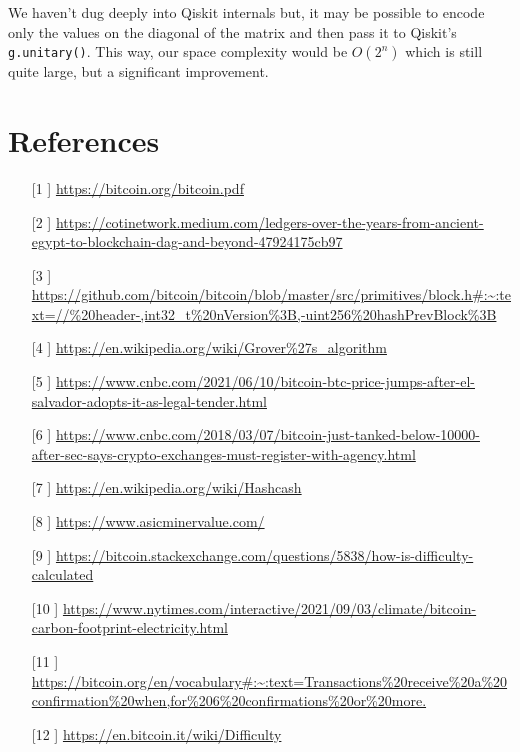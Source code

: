 \documentclass[11pt]{article} %
\begin{document}
\noindent We haven't dug deeply into Qiskit internals but, it may be possible to encode only the values on the diagonal of the matrix and then pass it to Qiskit's \lstinline{g.unitary()}. This way, our space complexity would be $O(2^n)$ which is still quite large, but a significant improvement.

\section{References}{}
\begin{itemize}
\item[[1]] \url{https://bitcoin.org/bitcoin.pdf}
\item [[2]] \url{https://cotinetwork.medium.com/ledgers-over-the-years-from-ancient-egypt-to-blockchain-dag-and-beyond-47924175cb97}
\item[[3]] \url{https://github.com/bitcoin/bitcoin/blob/master/src/primitives/block.h#:~:text=//%20header-,int32_t%20nVersion%3B,-uint256%20hashPrevBlock%3B}
\item [[4]] \url{https://en.wikipedia.org/wiki/Grover%27s_algorithm}
\noindent \item [[5]] \url{https://www.cnbc.com/2021/06/10/bitcoin-btc-price-jumps-after-el-salvador-adopts-it-as-legal-tender.html}
\noindent \item [[6]] \url{https://www.cnbc.com/2018/03/07/bitcoin-just-tanked-below-10000-after-sec-says-crypto-exchanges-must-register-with-agency.html}
\item[[7]] \url{https://en.wikipedia.org/wiki/Hashcash}
\item[[8]] \url{https://www.asicminervalue.com/}
\item[[9] ] \url{https://bitcoin.stackexchange.com/questions/5838/how-is-difficulty-calculated}
\item[[10]] \url{https://www.nytimes.com/interactive/2021/09/03/climate/bitcoin-carbon-footprint-electricity.html}
\item [[11]] \url{https://bitcoin.org/en/vocabulary#:~:text=Transactions%20receive%20a%20confirmation%20when,for%206%20confirmations%20or%20more.}
\item [[12]] \url{https://en.bitcoin.it/wiki/Difficulty}
\end{itemize}
\end{document}
